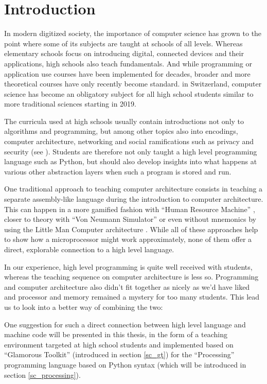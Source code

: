 
\chapter{Introduction}

In modern digitized society, the importance of computer science has grown to the point where some of its subjects are taught at schools of all levels. Whereas elementary schools focus on introducing digital, connected devices and their applications, high schools also teach fundamentals. And while programming or application use courses have been implemented for decades, broader and more theoretical courses have only recently become standard. \eg in Switzerland, computer science has become an obligatory subject for all high school students similar to more traditional sciences starting in 2019.

The curricula used at high schools usually contain introductions not only to algorithms and programming, but among other topics also into encodings, computer architecture, networking and social ramifications such as privacy and security (see \eg \cite{Erz16}). Students are therefore not only taught a high level programming language such as Python, but should also develop insights into what happens at various other abstraction layers when such a program is stored and run.

One traditional approach to teaching computer architecture consists in teaching a separate assembly-like language during the introduction to computer architecture. This can happen in a more gamified fashion \eg with ``Human Resource Machine'' \cite{Tom15}, closer to theory with ``Von Neumann Simulator'' \cite{Gan23} or even without mnemonics by using the Little Man Computer architecture \cite{Oin25}. While all of these approaches help to show how a microprocessor might work approximately, none of them offer a direct, explorable connection to a high level language.

In our experience, high level programming is quite well received with students, whereas the teaching sequence on computer architecture is less so. Programming and computer architecture also didn't fit together as nicely as we'd have liked and processor and memory remained a mystery for too many students. This lead us to look into a better way of combining the two:

One suggestion for such a direct connection between high level language and machine code will be presented in this thesis, in the form of a teaching environment targeted at high school students and implemented based on ``Glamorous Toolkit'' (introduced in section \ref{sc_gt}) for the ``Processing'' programming language based on Python syntax (which will be introduced in section \ref{sc_processing}).

